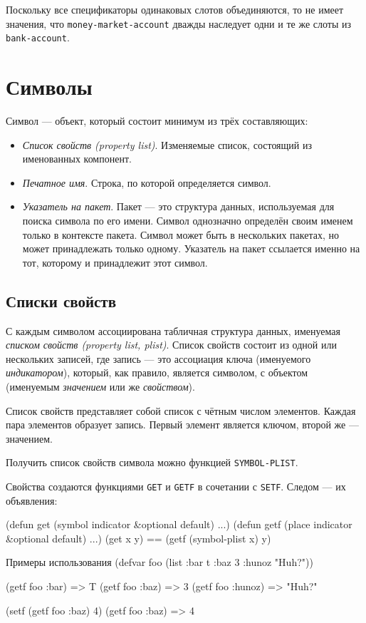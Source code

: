 Поскольку все спецификаторы одинаковых слотов объединяются, то не имеет значения, что \lstinline{money-market-account} дважды наследует одни и те же слоты из \lstinline{bank-account}.

\section{Символы}
Символ — объект, который состоит минимум из трёх составляющих:
\begin{itemize}
  \item \emph{Список свойств (property list)}. Изменяемые список, состоящий из именованных компонент.
  \item \emph{Печатное имя}. Строка, по которой определяется символ.
  \item \emph{Указатель на пакет}. Пакет — это структура данных, используемая для поиска символа по его имени. Символ однозначно определён своим именем только в контексте пакета. Символ может быть в нескольких пакетах, но может принадлежать только одному. Указатель на пакет ссылается именно на тот, которому и принадлежит этот символ.
\end{itemize}

\subsection{Списки свойств}
С каждым символом ассоциирована табличная структура данных, именуемая \emph{списком свойств (property list, plist)}. Список свойств состоит из одной или нескольких записей, где запись — это ассоциация ключа (именуемого \emph{индикатором}), который, как правило, является символом, с объектом (именуемым \emph{значением} или же \emph{свойством}).

Список свойств представляет собой список с чётным числом элементов. Каждая пара элементов образует запись. Первый элемент является ключом, второй же — значением.

Получить список свойств символа можно функцией \lstinline{SYMBOL-PLIST}.

Свойства создаются функциями \lstinline{GET} и \lstinline{GETF} в сочетании с \lstinline{SETF}. Следом — их объявления:
\begin{cllst}{}{}
(defun get (symbol indicator &optional default) ...)
(defun getf (place indicator &optional default) ...)
(get x y) == (getf (symbol-plist x) y)
\end{cllst}

\begin{cllst}{Примеры использования}{}
(defvar foo (list :bar t :baz 3 :hunoz "Huh?"))

(getf foo :bar)   => T
(getf foo :baz)   => 3
(getf foo :hunoz) => "Huh?"

(setf (getf foo :baz) 4)
(getf foo :baz)  => 4
\end{cllst}

